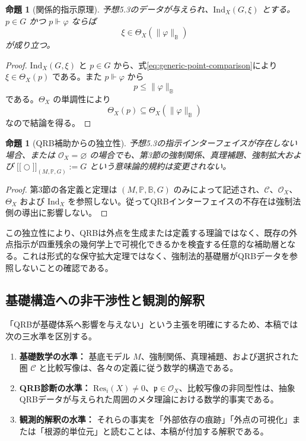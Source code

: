 \documentclass[a4paper,11pt]{ltjsarticle}
\theoremstyle{definition}
\theoremstyle{plain}
\newtheorem{proposition}[definition]{命題}
\newcommand{\Res}{\mathrm{Res}}
\newcommand{\Ind}{\mathrm{Ind}}
\newcommand{\dfix}{\bigcirc}
\newcommand{\sem}[1]{\mathopen{[\![}#1\mathclose{]\!]}}
\begin{document}
\begin{proposition}[関係的指示原理]
予想5.3のデータが与えられ、$\Ind_X(G,\xi)$ とする。$p\in G$ かつ $p\Vdash\varphi$ ならば
\begin{equation}
 \xi\in
 \Theta_X(\|\varphi\|_{\mathbb B})
 \label{eq:relational-indication-principle}
\end{equation}
が成り立つ。
\end{proposition}

\begin{proof}
$\Ind_X(G,\xi)$ と $p\in G$ から、式\eqref{eq:generic-point-comparison}により $\xi\in\Theta_X(p)$ である。また $p\Vdash\varphi$ から
\begin{equation}
 p\leq\|\varphi\|_{\mathbb B}
\end{equation}
である。$\Theta_X$ の単調性により
\begin{equation}
 \Theta_X(p)
 \subseteq
 \Theta_X(\|\varphi\|_{\mathbb B})
\end{equation}
なので結論を得る。
\end{proof}

\begin{proposition}[QRB補助からの独立性]
予想5.3の指示インターフェイスが存在しない場合、または $\mathcal O_X=\varnothing$ の場合でも、第3節の強制関係、真理補題、強制拡大および $\sem{\dfix}_{(M,\mathbb P,G)}:=G$ という意味論的規約は変更されない。
\end{proposition}

\begin{proof}
第3節の各定義と定理は $(M,\mathbb P,\mathbb B,G)$ のみによって記述され、$\mathcal C$、$\mathcal O_X$、$\Theta_X$ および $\Ind_X$ を参照しない。従ってQRBインターフェイスの不存在は強制法側の導出に影響しない。
\end{proof}

この独立性により、QRBは外点を生成または定義する理論ではなく、既存の外点指示が四重残余の幾何学上で可視化できるかを検査する任意的な補助層となる。これは形式的な保守拡大定理ではなく、強制法的基礎層がQRBデータを参照しないことの確認である。

\subsection{基礎構造への非干渉性と観測的解釈}

「QRBが基礎体系へ影響を与えない」という主張を明確にするため、本稿では次の三水準を区別する。
\begin{enumerate}
 \item \textbf{基礎数学の水準：} 基底モデル $M$、強制関係、真理補題、および選択された圏 $\mathcal C$ と比較写像は、各々の定義に従う数学的構造である。
 \item \textbf{QRB診断の水準：} $\Res_i(X)\neq0$、$\mathfrak p\in\mathcal O_X$、比較写像の非同型性は、抽象QRBデータが与えられた周囲のメタ理論における数学的事実である。
 \item \textbf{観測的解釈の水準：} それらの事実を「外部依存の痕跡」「外点の可視化」または「根源的単位元」と読むことは、本稿が付加する解釈である。
\end{enumerate}
\end{document}
